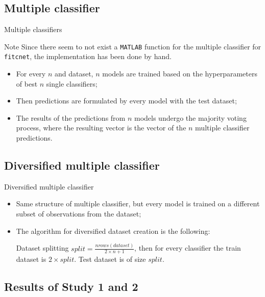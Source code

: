 \documentclass[12pt]{beamer}
\begin{document}
\subsection{Multiple classifier}

\begin{frame}{Multiple classifiers}
  \begin{alertblock}{Note}
    Since there seem to not exist a \texttt{MATLAB} function for the multiple
    classifier for \texttt{fitcnet}, the implementation has been done by hand.
  \end{alertblock}

\begin{itemize}
  \item For every $n$ and dataset, $n$ models are trained based on the hyperparameters
    of best $n$ single classifiers;
  \item Then predictions are formulated by every model with the test dataset;
  \item The results of the predictions from $n$ models undergo
    the majority voting process, where the resulting vector is the vector of the
    $n$ multiple classifier predictions.
\end{itemize}
\end{frame}

\subsection{Diversified multiple classifier}

\begin{frame}{Diversified multiple classifier}
  \begin{itemize}
    \item Same structure of multiple classifier, but every model is trained on
      a different subset of observations from the dataset;
    \item The algorithm for diversified dataset creation is the following:

    \begin{block}{Dataset splitting}
       $split = \frac{nrows(dataset)}{2 \times n +1}$, then for every classifier
      the train dataset is $2 \times split$. Test dataset is of size $split$.
      \end{block}
  \end{itemize}
\end{frame}

\subsection{Results of Study 1 and 2}
\end{document}
